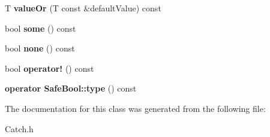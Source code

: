 \begin{DoxyCompactItemize}
\item 
\hypertarget{class_catch_1_1_option_a21b5629a7febbe3e23c475c9d9138a2d}{T {\bfseries value\-Or} (T const \&default\-Value) const }\label{class_catch_1_1_option_a21b5629a7febbe3e23c475c9d9138a2d}

\item 
\hypertarget{class_catch_1_1_option_affa96f15798b4656fb753ff52d12dec2}{bool {\bfseries some} () const }\label{class_catch_1_1_option_affa96f15798b4656fb753ff52d12dec2}

\item 
\hypertarget{class_catch_1_1_option_a389324d2aa20ceb0eb0f48a5f77c20c8}{bool {\bfseries none} () const }\label{class_catch_1_1_option_a389324d2aa20ceb0eb0f48a5f77c20c8}

\item 
\hypertarget{class_catch_1_1_option_a47a1b6f6def2730ea9d27a1860a4f97f}{bool {\bfseries operator!} () const }\label{class_catch_1_1_option_a47a1b6f6def2730ea9d27a1860a4f97f}

\item 
\hypertarget{class_catch_1_1_option_a637d4366ae7f0ded52ce59c8cb06da7b}{{\bfseries operator Safe\-Bool\-::type} () const }\label{class_catch_1_1_option_a637d4366ae7f0ded52ce59c8cb06da7b}

\end{DoxyCompactItemize}


The documentation for this class was generated from the following file\-:\begin{DoxyCompactItemize}
\item 
Catch.\-h\end{DoxyCompactItemize}
